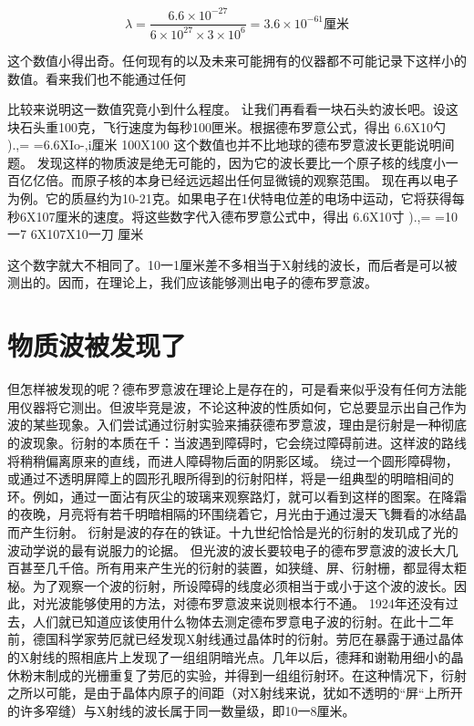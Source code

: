 $$
\lambda=\frac{6.6 \times 10^{-27}}{6 \times 10^{27} \times 3 \times 10^{6}}=3.6 \times 10^{-61} 厘米
$$

这个数值小得出奇。任何现有的以及未来可能拥有的仪器都不可能记录下这样小的数值。看来我们也不能通过任何



比较来说明这一数值究竟小到什么程度。
让我们再看看一块石头虳波长吧。设这块石头重100克，飞行速度为每秒100匣米。根据德布罗意公式，得出
6.6X10勺
	).,=	=6.6XIo-,i厘米
100X100
这个数值也并不比地球的德布罗意波长更能说明间题。
发现这样的物质波是绝无可能的，因为它的波长要比一个原子核的线度小一百亿亿倍。而原子核的本身已经远远超出任何显微镜的观察范围。
现在再以电子为例。它的质昼约为10-21克。如果电子在1伏特电位差的电场中运动，它将获得每秒6X107厘米的速度。将这些数字代入德布罗意公式中，得出
6.6X10寸
	).,=	=10一7
6X107X10一刀
厘米

这个数字就大不相同了。10一1厘米差不多相当于X射线的波长，而后者是可以被测出的。因而，在理论上，我们应该能够测出电子的德布罗意波。

\section{物质波被发现了}

但怎样被发现的呢？德布罗意波在理论上是存在的，可是看来似乎没有任何方法能用仪器将它测出。但波毕竞是波，不论这种波的性质如何，它总要显示出自己作为波的某些现象。入们尝试通过衍射实验来捕获德布罗意波，理由是衍射是一种彻底的波现象。衍射的本质在千：当波遇到障碍时，它会绕过障碍前进。这样波的路线将稍稍偏离原来的直线，而进人障碍物后面的阴影区域。
绕过一个圆形障碍物，或通过不透明屏障上的圆形孔眼所得到的衍射阳样，将是一组典型的明暗相间的环。例如，通过一面沾有灰尘的玻璃来观察路灯，就可以看到这样的图案。在降霜的夜晚，月亮将有若千明暗相隔的环围绕着它，月光由于通过漫天飞舞看的冰结晶而产生衍射。
衍射是波的存在的铁证。十九世纪恰恰是光的衍射的发玑成了光的波动学说的最有说服力的论据。
但光波的波长要较电子的德布罗意波的波长大几百甚至几千倍。所有用来产生光的衍射的装置，如狭缝、屏、衍射栅，都显得太粔柲。为了观察一个波的衍射，所设障碍的线度必须相当于或小于这个波的波长。因此，对光波能够使用的方法，对德布罗意波来说则根本行不通。
1924年还没有过去，人们就已知道应该使用什么物体去测定德布罗意电子波的衍射。在此十二年前，德国科学家劳厄就已经发现X射线通过晶体时的衍射。劳厄在暴露于通过晶体的X射线的照相底片上发现了一组组阴暗光点。几年以后，德拜和谢勒用细小的晶休粉末制成的光栅重复了劳厄的实验，并得到一组组衍射环。在这种情况下，衍射之所以可能，是由于晶体内原子的间距（对X射线来说，犹如不透明的“屏“上所开的许多窄缝）与X射线的波长属于同一数量级，即10一8厘米。

